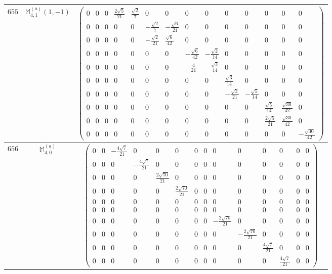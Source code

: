 \documentclass[fleqn,8pt,landscape]{jsarticle}
\begin{document}
\begin{center}
\begin{longtable}{ccc}
$ 655 $ & $ \mathbb{M}_{4,1}^{(a)}(1,-1) $ & $ \begin{pmatrix} 0 & 0 & 0 & \frac{2 \sqrt{5}}{21} & \frac{\sqrt{2}}{7} & 0 & 0 & 0 & 0 & 0 & 0 & 0 & 0 & 0 \\ 0 & 0 & 0 & 0 & 0 & - \frac{\sqrt{2}}{7} & - \frac{\sqrt{6}}{21} & 0 & 0 & 0 & 0 & 0 & 0 & 0 \\ 0 & 0 & 0 & 0 & 0 & - \frac{\sqrt{2}}{21} & \frac{\sqrt{6}}{42} & 0 & 0 & 0 & 0 & 0 & 0 & 0 \\ 0 & 0 & 0 & 0 & 0 & 0 & 0 & - \frac{\sqrt{6}}{42} & - \frac{\sqrt{2}}{14} & 0 & 0 & 0 & 0 & 0 \\ 0 & 0 & 0 & 0 & 0 & 0 & 0 & - \frac{4}{21} & - \frac{\sqrt{3}}{14} & 0 & 0 & 0 & 0 & 0 \\ 0 & 0 & 0 & 0 & 0 & 0 & 0 & 0 & 0 & \frac{\sqrt{3}}{14} & 0 & 0 & 0 & 0 \\ 0 & 0 & 0 & 0 & 0 & 0 & 0 & 0 & 0 & - \frac{\sqrt{2}}{21} & - \frac{\sqrt{5}}{14} & 0 & 0 & 0 \\ 0 & 0 & 0 & 0 & 0 & 0 & 0 & 0 & 0 & 0 & 0 & \frac{\sqrt{5}}{14} & \frac{\sqrt{30}}{42} & 0 \\ 0 & 0 & 0 & 0 & 0 & 0 & 0 & 0 & 0 & 0 & 0 & \frac{2 \sqrt{5}}{21} & \frac{\sqrt{30}}{42} & 0 \\ 0 & 0 & 0 & 0 & 0 & 0 & 0 & 0 & 0 & 0 & 0 & 0 & 0 & - \frac{\sqrt{30}}{42} \end{pmatrix} $ \\ \hline
$ 656 $ & $ \mathbb{M}_{4,0}^{(a)} $ & $ \begin{pmatrix} 0 & 0 & - \frac{4 \sqrt{7}}{21} & 0 & 0 & 0 & 0 & 0 & 0 & 0 & 0 & 0 & 0 & 0 \\ 0 & 0 & 0 & - \frac{4 \sqrt{7}}{21} & 0 & 0 & 0 & 0 & 0 & 0 & 0 & 0 & 0 & 0 \\ 0 & 0 & 0 & 0 & \frac{2 \sqrt{70}}{21} & 0 & 0 & 0 & 0 & 0 & 0 & 0 & 0 & 0 \\ 0 & 0 & 0 & 0 & 0 & \frac{2 \sqrt{70}}{21} & 0 & 0 & 0 & 0 & 0 & 0 & 0 & 0 \\ 0 & 0 & 0 & 0 & 0 & 0 & 0 & 0 & 0 & 0 & 0 & 0 & 0 & 0 \\ 0 & 0 & 0 & 0 & 0 & 0 & 0 & 0 & 0 & 0 & 0 & 0 & 0 & 0 \\ 0 & 0 & 0 & 0 & 0 & 0 & 0 & 0 & - \frac{2 \sqrt{70}}{21} & 0 & 0 & 0 & 0 & 0 \\ 0 & 0 & 0 & 0 & 0 & 0 & 0 & 0 & 0 & - \frac{2 \sqrt{70}}{21} & 0 & 0 & 0 & 0 \\ 0 & 0 & 0 & 0 & 0 & 0 & 0 & 0 & 0 & 0 & \frac{4 \sqrt{7}}{21} & 0 & 0 & 0 \\ 0 & 0 & 0 & 0 & 0 & 0 & 0 & 0 & 0 & 0 & 0 & \frac{4 \sqrt{7}}{21} & 0 & 0 \end{pmatrix} $ \\ \hline

\end{longtable}
\end{center}
\end{document}
